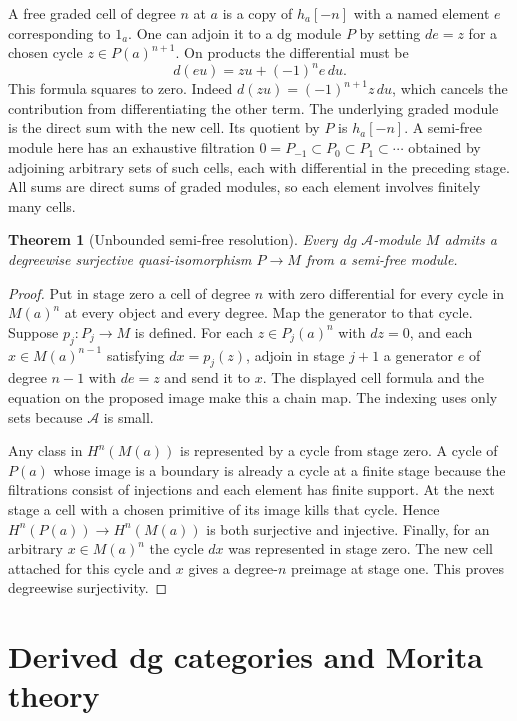 \documentclass[11pt,oneside,openany]{book}
\newtheorem{theorem}{Theorem}[chapter]
\theoremstyle{definition}
\theoremstyle{remark}
\begin{document}
A free graded cell of degree \(n\) at \(a\) is a copy of
\(h_a[-n]\) with a named element \(e\) corresponding to \(1_a\).
One can adjoin it to a dg module \(P\) by setting \(de=z\) for
a chosen cycle \(z\in P(a)^{n+1}\). On products the
differential must be
\[
                 d(eu)=z u+(-1)^n e\,d u.
\]
This formula squares to zero. Indeed \(d(z u)=(-1)^{n+1}z\,du\),
which cancels the contribution from differentiating the other
term. The underlying graded module is the direct sum with the
new cell. Its quotient by \(P\) is \(h_a[-n]\). A semi-free module
here has an exhaustive filtration
\(0=P_{-1}\subset P_0\subset P_1\subset\cdots\)
obtained by adjoining arbitrary sets of such cells, each with
differential in the preceding stage. All sums are direct sums of
graded modules, so each element involves finitely many cells.

\begin{theorem}[Unbounded semi-free resolution]\label{res:G06}
Every dg \(\mathcal A\)-module \(M\) admits a degreewise surjective
quasi-isomorphism \(P\to M\) from a semi-free module.
\end{theorem}
\begin{proof}
Put in stage zero a cell of degree \(n\) with zero differential
for every cycle in \(M(a)^n\) at every object and every degree.
Map the generator to that cycle. Suppose \(p_j:P_j\to M\) is
defined. For each \(z\in P_j(a)^n\) with \(dz=0\), and each
\(x\in M(a)^{n-1}\) satisfying \(dx=p_j(z)\), adjoin in stage \(j+1\)
a generator \(e\) of degree \(n-1\) with \(de=z\) and send it to \(x\).
The displayed cell formula and the equation on the proposed image
make this a chain map. The indexing uses only sets because
\(\mathcal A\) is small.

Any class in \(H^n(M(a))\) is represented by a cycle from stage zero.
A cycle of \(P(a)\) whose image is a boundary is already a cycle
at a finite stage because the filtrations consist of injections
and each element has finite support. At the next stage a cell
with a chosen primitive of its image kills that cycle. Hence
\(H^n(P(a))\to H^n(M(a))\) is both surjective and injective.
Finally, for an arbitrary \(x\in M(a)^n\) the cycle \(dx\) was
represented in stage zero. The new cell attached for this cycle
and \(x\) gives a degree-\(n\) preimage at stage one. This proves
degreewise surjectivity.
\end{proof}
\chapter{Derived dg categories and Morita theory}
\label{ch:dg-categories}
\end{document}

